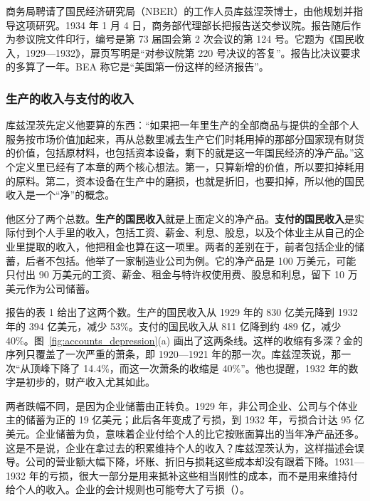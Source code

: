 商务局聘请了国民经济研究局（NBER）的工作人员库兹涅茨博士，由他规划并指导这项研究\cite{kuznets1934}。1934 年 1 月 4 日，商务部代理部长把报告送交参议院。报告随后作为参议院文件印行，编号是第 73 届国会第 2 次会议的第 124 号。它题为《国民收入，1929—1932》，扉页写明是“对参议院第 220 号决议的答复”\cite{kuznets1934}。报告比决议要求的多算了一年。BEA 称它是“美国第一份这样的经济报告”\cite{bea2020}。

\subsubsection{生产的收入与支付的收入}
库兹涅茨先定义他要算的东西：“如果把一年里生产的全部商品与提供的全部个人服务按市场价值加起来，再从总数里减去生产它们时耗用掉的那部分国家现有财货的价值，包括原材料，也包括资本设备，剩下的就是这一年国民经济的净产品。”\cite{kuznets1934}这个定义里已经有了本章的两个核心想法。第一，只算新增的价值，所以要扣掉耗用的原料。第二，资本设备在生产中的磨损，也就是折旧，也要扣掉，所以他的国民收入是一个“净”的概念。

他区分了两个总数。\textbf{生产的国民收入}就是上面定义的净产品。\textbf{支付的国民收入}是实际付到个人手里的收入，包括工资、薪金、利息、股息，以及个体业主从自己的企业里提取的收入，他把租金也算在这一项里。两者的差别在于，前者包括企业的储蓄，后者不包括\cite{kuznets1934}。他举了一家制造业公司为例。它的净产品是 100 万美元，可能只付出 90 万美元的工资、薪金、租金与特许权使用费、股息和利息，留下 10 万美元作为公司储蓄\cite{kuznets1934}。

报告的表 1 给出了这两个数。生产的国民收入从 1929 年的 830 亿美元降到 1932 年的 394 亿美元，减少 53\%。支付的国民收入从 811 亿降到约 489 亿，减少 40\%\cite{kuznets1934}。图~\ref{fig:accounts_depression}(a) 画出了这两条线。这样的收缩有多深？金的序列只覆盖了一次严重的萧条，即 1920—1921 年的那一次。库兹涅茨说，那一次“从顶峰下降了 14.4\%，而这一次萧条的收缩是 40\%”\cite{kuznets1934}。他也提醒，1932 年的数字是初步的，财产收入尤其如此\cite{kuznets1934}。

两者跌幅不同，是因为企业储蓄由正转负。1929 年，非公司企业、公司与个体业主的储蓄为正的 19 亿美元；此后各年变成了亏损，到 1932 年，亏损合计达 95 亿美元\cite{kuznets1934}。企业储蓄为负，意味着企业付给个人的比它按账面算出的当年净产品还多。这是不是说，企业在拿过去的积累维持个人的收入？库兹涅茨认为，这样描述会误导。公司的营业额大幅下降，坏账、折旧与损耗这些成本却没有跟着下降。1931—1932 年的亏损，很大一部分是用来抵补这些相当刚性的成本，而不是用来维持付给个人的收入。企业的会计规则也可能夸大了亏损（）\cite{kuznets1934}。

